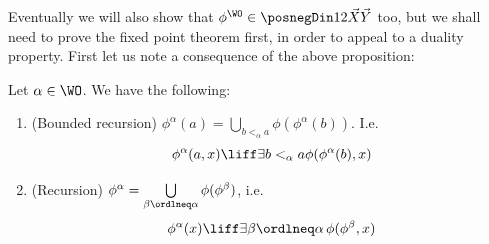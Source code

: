 Eventually we will also show that $\phi^\WO \in \posnegDin 1 2 {\vec X}{\vec Y}$ too, but we shall need to prove the fixed point theorem first, in order to appeal to a duality property.
First let us note a consequence of the above proposition:
\begin{corollary}
    \label{cor:(bdd)-recursion}
   Let $\alpha \in \WO$. We have the following:
    \begin{enumerate}
        \item\label{item:bdd-recursion} (Bounded recursion) $\phi^\alpha(a) = \bigcup\limits_{b<_\alpha a} \phi(\phi^\alpha(b))$.
    I.e.\
    \[\phi^\alpha(a,x) \liff \exists b<_\alpha a \phi(\phi^\alpha(b),x)
    \]
    \item\label{item:recursion} (Recursion) $\phi^\alpha = \bigcup\limits_{\beta \ordlneq \alpha} \phi(\phi^\beta)$, i.e.\ 
    \[
    \phi^\alpha(x) \liff \exists \beta \ordlneq \alpha\, \phi(\phi^\beta, x)
    \]
    \end{enumerate}
\end{corollary}

